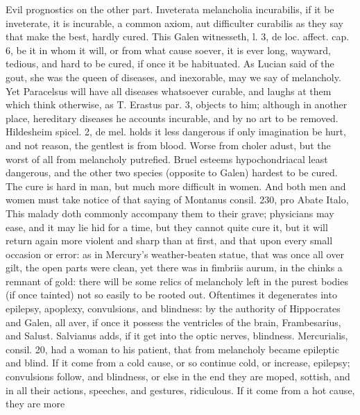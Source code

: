 Evil prognostics on the other part. Inveterata melancholia incurabilis,
if it be inveterate, it is incurable, a common axiom, aut
difficulter curabilis as they say that make the best, hardly cured.
This Galen witnesseth, l. 3, de loc. affect. cap. 6, be it in
whom it will, or from what cause soever, it is ever long, wayward,
tedious, and hard to be cured, if once it be habituated. As Lucian said
of the gout, she was the queen of diseases, and inexorable, may
we say of melancholy. Yet Paracelsus will have all diseases whatsoever
curable, and laughs at them which think otherwise, as T. Erastus par.
3, objects to him; although in another place, hereditary diseases he
accounts incurable, and by no art to be removed. Hildesheim
spicel. 2, de mel. holds it less dangerous if only imagination be
hurt, and not reason, the gentlest is from blood. Worse from
choler adust, but the worst of all from melancholy putrefied.
Bruel esteems hypochondriacal least dangerous, and the other two
species (opposite to Galen) hardest to be cured. The cure is hard
in man, but much more difficult in women. And both men and women must
take notice of that saying of Montanus consil. 230, pro Abate Italo,
This malady doth commonly accompany them to their grave;
physicians may ease, and it may lie hid for a time, but they cannot
quite cure it, but it will return again more violent and sharp than at
first, and that upon every small occasion or error: as in Mercury's
weather-beaten statue, that was once all over gilt, the open parts were
clean, yet there was in fimbriis aurum, in the chinks a remnant of
gold: there will be some relics of melancholy left in the purest bodies
(if once tainted) not so easily to be rooted out.  Oftentimes it
degenerates into epilepsy, apoplexy, convulsions, and blindness: by the
authority of Hippocrates and Galen, all aver, if once it possess
the ventricles of the brain, Frambesarius, and Salust. Salvianus adds,
if it get into the optic nerves, blindness. Mercurialis, consil. 20,
had a woman to his patient, that from melancholy became epileptic and
blind. If it come from a cold cause, or so continue cold, or
increase, epilepsy; convulsions follow, and blindness, or else in the
end they are moped, sottish, and in all their actions, speeches, and
gestures, ridiculous. If it come from a hot cause, they are more
